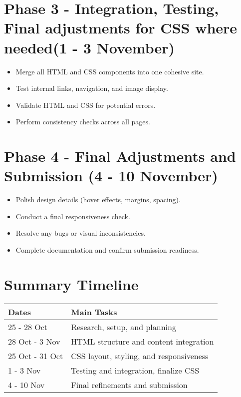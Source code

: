 \documentclass[a4paper,12pt]{article}
\begin{document}
\section{Phase 3 - Integration, Testing, Final adjustments for {\LARGE CSS} where needed(1 - 3 November)}
\begin{itemize}[leftmargin=1.2cm]
    \item Merge all HTML and CSS components into one cohesive site.
    \item Test internal links, navigation, and image display.
    \item Validate HTML and CSS for potential errors.
    \item Perform consistency checks across all pages.
\end{itemize}

\section{Phase 4 - Final Adjustments and Submission (4 - 10 November)}
\begin{itemize}[leftmargin=1.2cm]
    \item Polish design details (hover effects, margins, spacing).
    \item Conduct a final responsiveness check.
    \item Resolve any bugs or visual inconsistencies.
    \item Complete documentation and confirm submission readiness.
\end{itemize}

\section*{Summary Timeline}
\begin{center}
\begin{tabular}{|l|l|}
\hline
\textbf{Dates} & \textbf{Main Tasks} \\
\hline
25 - 28 Oct & Research, setup, and planning \\
28 Oct - 3 Nov & HTML structure and content integration \\
25 Oct - 31 Oct & CSS layout, styling, and responsiveness \\
1 - 3 Nov & Testing and integration, finalize CSS \\
4 - 10 Nov & Final refinements and submission \\
\hline
\end{tabular}
\end{center}
\end{document}

